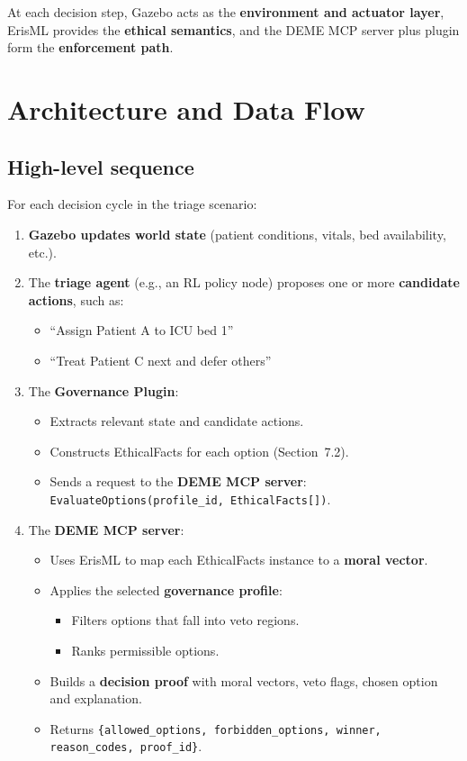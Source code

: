 \documentclass[11pt]{article}
\begin{document}
At each decision step, Gazebo acts as the \textbf{environment and actuator layer}, ErisML provides the \textbf{ethical semantics}, and the DEME MCP server plus plugin form the \textbf{enforcement path}.

\section{Architecture and Data Flow}

\subsection{High-level sequence}

For each decision cycle in the triage scenario:

\begin{enumerate}
  \item \textbf{Gazebo updates world state} (patient conditions, vitals, bed availability, etc.).

  \item The \textbf{triage agent} (e.g., an RL policy node) proposes one or more \textbf{candidate actions}, such as:
    \begin{itemize}
      \item ``Assign Patient A to ICU bed 1''
      \item ``Treat Patient C next and defer others''
    \end{itemize}

  \item The \textbf{Governance Plugin}:
    \begin{itemize}
      \item Extracts relevant state and candidate actions.
      \item Constructs EthicalFacts for each option (Section~7.2).
      \item Sends a request to the \textbf{DEME MCP server}: \texttt{EvaluateOptions(profile\_id, EthicalFacts[])}.
    \end{itemize}

  \item The \textbf{DEME MCP server}:
    \begin{itemize}
      \item Uses ErisML to map each EthicalFacts instance to a \textbf{moral vector}.
      \item Applies the selected \textbf{governance profile}:
        \begin{itemize}
          \item Filters options that fall into veto regions.
          \item Ranks permissible options.
        \end{itemize}
      \item Builds a \textbf{decision proof} with moral vectors, veto flags, chosen option and explanation.
      \item Returns \texttt{\{allowed\_options, forbidden\_options, winner, reason\_codes, proof\_id\}}.
    \end{itemize}


\end{enumerate}
\end{document}
